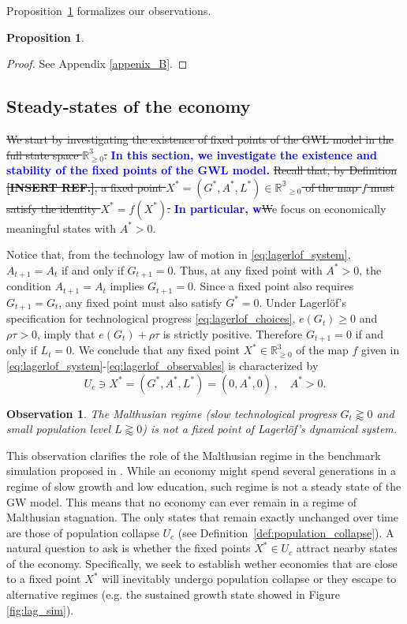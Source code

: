 \documentclass[a4paper,fleqn]{cas-sc}
\newtheorem{proposition}{Proposition}
\newtheorem{observation}{Observation}
\newcommand{\samb}[1]{\textcolor{blue}{\textbf{#1}}}
\begin{document}
Proposition~\ref{prop:section_3_1} formalizes our observations.
\begin{proposition}     \label{prop:section_3_1}

\end{proposition}
%
\begin{proof}
    See Appendix \ref{appenix_B}.
\end{proof}
%
\subsection{Steady-states of the economy}\label{subsec:fixed_points}
\sout{We start by investigating the existence of fixed points of the GWL model in the full state space $\mathbb{R}^3_{\geq0}$. }\samb{In this section, we investigate the existence and stability of the fixed points of the GWL model.}
\sout{Recall that, by Definition \textbf{[INSERT REF.]}, a fixed point $X^*=(G^*,A^*,L^*)\in\mathbb{R^3}_{\geq0}$ of the map $f$ must satisfy the identity $X^*=f(X^*)$.}
\samb{In particular, w}\sout{W}e focus on economically meaningful states with $A^*>0$.

Notice that, from the technology law of motion in \eqref{eq:lagerlof_system}, $A_{t+1}=A_{t}$ if and only if $ G_{t+1}=0$.
Thus, at any fixed point with $A^*>0$, the condition $A_{t+1}=A_t$ implies $G_{t+1}=0$. 
Since a fixed point also requires $G_{t+1}=G_t$, any fixed point must also satisfy $G^*=0$.
Under Lagerl\"of's specification for technological progress \eqref{eq:lagerlof_choices}, $e(G_t)\geq0$ and $\rho\tau>0$, imply that $e(G_t)+\rho\tau$ is strictly positive. 
Therefore $G_{t+1}=0$ if and only if $L_t=0$.
We conclude that any fixed point $X^*\in \mathbb{R}^3_{\geq0}$ of the map $f$ given in \eqref{eq:lagerlof_system}-\eqref{eq:lagerlof_observables} is characterized by
%
\begin{equation}\label{eq:line_fixed_points}
     U_c\ni X^*=(G^*,A^*,L^*)=(0,A^*,0)\,,\quad A^*>0.
\end{equation}
%
\begin{observation}\label{obs:malthusian_trap}
     The Malthusian regime (slow technological progress $G_t\gtrapprox0$ and small population level $L\gtrapprox0$) is not a fixed point of Lagerl\"{o}f's dynamical system.
\end{observation}
%
This observation clarifies the role of the Malthusian regime in the benchmark simulation proposed in \cite{Lagerlof2006}.
While an economy might spend several generations in a regime of slow growth and low education, such regime is not a steady state of the GW model. 
This means that no economy can ever remain in a regime of Malthusian stagnation.
The only states that remain exactly unchanged over time are those of population collapse $U_c$ (see Definition~\ref{def:population_collapse}).
A natural question to ask is whether the fixed points $X^*\in U_c$ attract nearby states of the economy.
Specifically, we seek to establish wether economies that are close to a fixed point $X^*$ will inevitably undergo population collapse or they escape to alternative regimes (e.g. the sustained growth state showed in Figure \ref{fig:lag_sim}).
\end{document}
